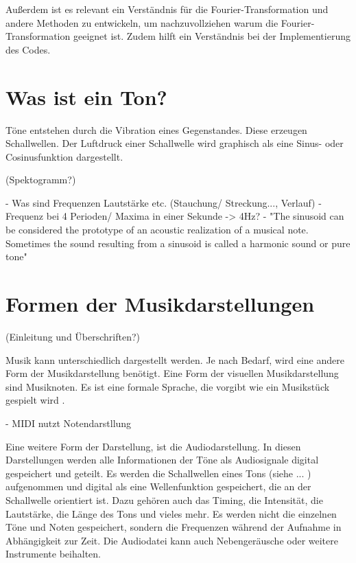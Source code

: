 \par

Außerdem ist es relevant ein Verständnis für die Fourier-Transformation und andere Methoden zu entwickeln, um nachzuvollziehen warum die Fourier-Transformation geeignet ist. Zudem hilft ein Verständnis bei der Implementierung des Codes.

%
\section{Was ist ein Ton?}
%

Töne entstehen durch die Vibration eines Gegenstandes. Diese erzeugen Schallwellen. Der Luftdruck einer Schallwelle wird graphisch als eine Sinus- oder Cosinusfunktion dargestellt.

%
(Spektogramm?)
%

 - Was sind Frequenzen Lautstärke etc. (Stauchung/ Streckung..., Verlauf)
 - Frequenz bei 4 Perioden/ Maxima in einer Sekunde -> 4Hz?
 - "The sinusoid can be considered the prototype of an acoustic realization of a musical note. Sometimes the sound resulting from a sinusoid is called a harmonic sound
or pure tone"

%
\section{Formen der Musikdarstellungen}
%

%
(Einleitung und Überschriften?)
%

Musik kann unterschiedlich dargestellt werden. Je nach Bedarf, wird eine andere Form der Musikdarstellung benötigt. Eine Form der visuellen Musikdarstellung sind Musiknoten. Es ist eine formale Sprache, die vorgibt wie ein Musikstück gespielt wird \parencite{sheet_music_representations}.

\par

 - MIDI nutzt Notendarstllung

\par

Eine weitere Form der Darstellung, ist die Audiodarstellung. In diesen Darstellungen werden alle Informationen der Töne als Audiosignale digital gespeichert und geteilt. Es werden die Schallwellen eines Tons (siehe ... ) aufgenommen und digital als eine Wellenfunktion gespeichert, die an der Schallwelle orientiert ist. Dazu gehören auch das Timing, die Intensität, die Lautstärke, die Länge des Tons und vieles mehr. Es werden nicht die einzelnen Töne und Noten gespeichert, sondern die Frequenzen während der Aufnahme in Abhängigkeit zur Zeit. Die Audiodatei kann auch Nebengeräusche oder weitere Instrumente beihalten.

